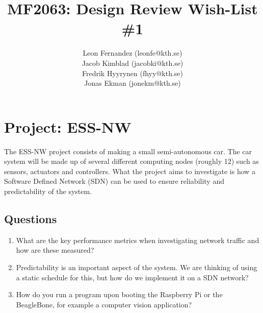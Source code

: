 \documentclass[11pt]{article} %
\title{MF2063: Design Review Wish-List \#1}
\author{Leon Fernandez (leonfe@kth.se) \\
        Jacob Kimblad (jacobki@kth.se) \\
        Fredrik Hyyrynen (fhyy@kth.se) \\
        Jonas Ekman (jonekm@kth.se)}
\date{} %
\begin{document}
\maketitle

\section*{Project: ESS-NW}
The ESS-NW project consists of making a small semi-autonomous car. The car system will be made up of several different computing nodes (roughly 12) such as
sensors, actuators and controllers. What the project aims to investigate is how a Software Defined Network (SDN) can be used to ensure
reliability and predictability of the system.


\subsection*{Questions}
\begin{enumerate}
\item What are the key performance metrics when investigating network traffic and how are these measured?
\item Predictability is an important aspect of the system. We are thinking of using a static schedule for this, but how do we implement it on a SDN network?
\item How do you run a program upon booting the Raspberry Pi or the BeagleBone, for example a computer vision application?
\end{enumerate}
\end{document}

